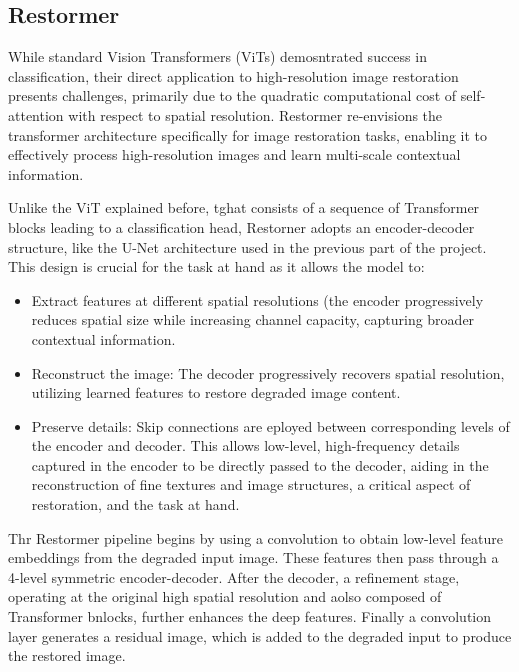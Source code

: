 \documentclass[openany, 12pt]{article}
\begin{document}
\subsection{Restormer}
While standard Vision Transformers (ViTs) demosntrated success in classification, their direct application to high-resolution image restoration presents challenges, primarily due to the quadratic computational cost of self-attention with respect to spatial resolution. Restormer \cite{restormer}re-envisions the transformer architecture specifically for image restoration tasks, enabling it to effectively process high-resolution images and learn multi-scale contextual information.

Unlike the ViT explained before, tghat consists of a sequence of Transformer blocks leading to a classification head, Restorner adopts an encoder-decoder structure, like the U-Net architecture used in the previous part of the project. This design is crucial for the task at hand as it allows the model to: \begin{itemize}
    \item Extract features at different spatial resolutions (the encoder progressively reduces spatial size while increasing channel capacity, capturing broader contextual information.
    \item Reconstruct the image: The decoder progressively recovers spatial resolution, utilizing learned features to restore degraded image content.
    \item Preserve details: Skip connections are eployed between corresponding levels of the encoder and decoder. This allows low-level, high-frequency details captured in the encoder to be directly passed to the decoder, aiding in the reconstruction of fine textures and image structures, a critical aspect of restoration, and the task at hand.
\end{itemize}
Thr Restormer pipeline begins by using a convolution to obtain low-level feature embeddings from the degraded input image. These features then pass through a 4-level symmetric encoder-decoder. After the decoder, a refinement stage, operating at the original high spatial resolution and aolso composed of Transformer bnlocks, further enhances the deep features. Finally a convolution layer generates a residual image, which is added to the degraded input to produce the restored image.
\end{document}
